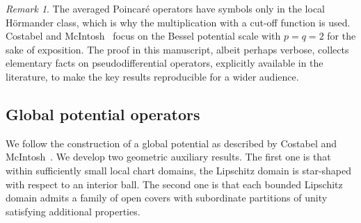 \documentclass[10pt,a4paper]{amsart}
\theoremstyle{definition}
\theoremstyle{remark}
\newtheorem{remark}[theorem]{Remark}
\numberwithin{equation}{section}
\begin{document}
   
        



    
    






\begin{remark}
    The averaged Poincar\'e operators have symbols only in the local Hörmander class, which is why the multiplication with a cut-off function is used.
    Costabel and McIntosh~\cite{costabel2010} focus on the Bessel potential scale with $p=q=2$ for the sake of exposition. 
    The proof in this manuscript, albeit perhaps verbose, collects elementary facts on pseudodifferential operators, explicitly available in the literature, 
    to make the key results reproducible for a wider audience.
\end{remark}



\subsection{Global potential operators}

We follow the construction of a global potential as described by Costabel and McIntosh~\cite{costabel2010}. 
We develop two geometric auxiliary results. 
The first one is that within sufficiently small local chart domains, the Lipschitz domain is star-shaped with respect to an interior ball. 
The second one is that each bounded Lipschitz domain admits a family of open covers with subordinate partitions of unity satisfying additional properties.
\end{document}
